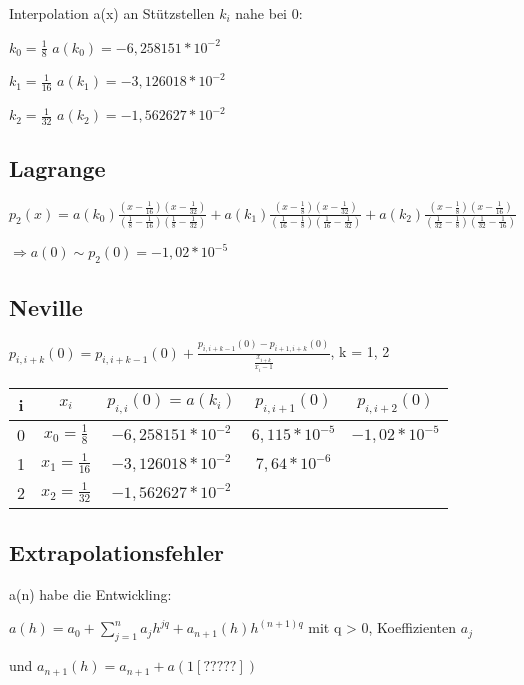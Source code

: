 \documentclass[12pt,a4paper]{article} %
\newcommand*\tab[1][1cm]{\hspace*{#1}}
\begin{document}
	Interpolation a(x) an Stützstellen $k_i$ nahe bei 0:
	
	$k_0 = \frac{1}{8}$ \tab $a(k_0) = -6,258151 * 10^{-2}$
	
	$k_1 = \frac{1}{16}$ \tab $a(k_1) = -3,126018 * 10^{-2}$
	
	$k_2 = \frac{1}{32}$ \tab $a(k_2) = -1,562627 * 10^{-2}$
	
	\subsection{Lagrange}
	
	$p_2(x) = a(k_0) \frac{(x - \frac{1}{16})(x - \frac{1}{32})}{(\frac{1}{8} - \frac{1}{16})(\frac{1}{8} - \frac{1}{32})} + a(k_1)\frac{(x - \frac{1}{8})(x - \frac{1}{32})}{(\frac{1}{16} - \frac{1}{8})(\frac{1}{16} - \frac{1}{32})} + a(k_2) \frac{(x - \frac{1}{8})(x - \frac{1}{16})}{(\frac{1}{32} - \frac{1}{8})(\frac{1}{32} - \frac{1}{16})}$
	
	$\Rightarrow a(0) \sim p_2(0) = -1,02 * 10^{-5}$
	
	\subsection{Neville}
	
	$p_{i, i + k}(0) = p_{i, i + k - 1}(0) + \frac{p_{i, i + k - 1}(0) - p_{i + 1, i + k}(0)}{\frac{x_{i + k}}{x_i - 1}}$, k = 1, 2
	
	\begin{tabular}{ c | c | c | c | c }
		i & $x_i$ & $p_{i, i}(0) = a(k_i)$ & $p_{i, i + 1}(0)$ & $p_{i, i + 2}(0)$ \\ \hline
		0 & $x_0 = \frac{1}{8}$ & $-6,258151 * 10^{-2}$ & $6,115 * 10^{-5}$ & $-1,02 * 10^{-5}$ \\
		1 & $x_1 = \frac{1}{16}$ & $-3,126018 * 10^{-2}$ & $7,64 * 10^{-6}$ & \\
		2 & $x_2 = \frac{1}{32}$ & $-1,562627 * 10^{-2}$ & & 
	\end{tabular}

	\subsection{Extrapolationsfehler}
	
	a(n) habe die Entwickling:
	
	$a(h) = a_0 + \sum\limits_{j = 1}^{n}a_jh^{jq} + a_{n + 1}(h)h^{(n+1)q}$ \tab mit q > 0,
	 Koeffizienten $a_j$ 
	 
	und $a_{n + 1}(h) = a_{n + 1} + a(1[?????])$
	
\end{document}
